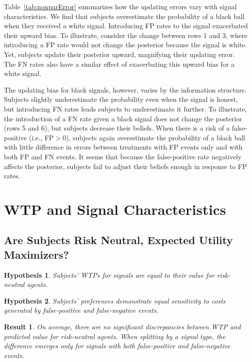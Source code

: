 \documentclass[12pt,a4paper]{article}
\newtheorem{hypothesis}{Hypothesis}
\newtheorem{result}{Result}
\begin{document}
Table~\ref{tab:nonparError} summarizes how the updating errors vary with signal characteristics. We find that subjects overestimate the probability of a black ball when they received a white signal. Introducing FP rates to the signal exacerbated their upward bias. To illustrate, consider the change between rows 1 and 3, where introducing a FP rate would not change the posterior because the signal is white. Yet, subjects update their posterior upward, magnifying their updating error. The FN rates also have a similar effect of exacerbating this upward bias for a white signal.

The updating bias for black signals, however, varies by the information structure. Subjects slightly underestimate the probability even when the signal is honest, but introducing FN rates leads subjects to underestimate it further. To illustrate, the introduction of a FN rate given a black signal does not change the posterior (rows 5 and 6), but subjects decrease their beliefs. When there is a risk of a false-positive (i.e., FP$>$0), subjects again overestimate the probability of a black ball with little difference in errors between treatments with FP events only and with both FP and FN events. It seems that because the false-positive rate negatively affects the posterior, subjects fail to adjust their beliefs enough in response to FP rates.


\vspace{20pt}

\section{WTP and Signal Characteristics}\label{sec:results}

\subsection{Are Subjects Risk Neutral, Expected Utility Maximizers?} 

\begin{hypothesis}\label{hyp:eqRN} 
Subjects' WTPs for signals are equal to their value for risk-neutral agents. 
\end{hypothesis}

\begin{hypothesis}\label{hyp:eqSen} 
Subjects' preferences demonstrate equal sensitivity to costs generated by false-positive and false-negative events. 
\end{hypothesis}

\begin{result} 
On average, there are no significant discrepancies between WTP and predicted value for risk-neutral agents. When splitting by a signal type, the difference emerges only for signals with both false-positive and false-negative events.
\end{result}
\end{document}
